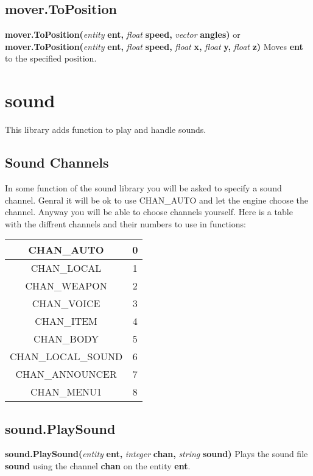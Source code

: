 \documentclass{scrreprt}
\begin{document}
\subsection{mover.ToPosition}
\label{mver-toposition}
\textbf{mover.ToPosition(}\textit{entity}\textbf{ ent, }\textit{float}\textbf{ speed, }\textit{vector}\textbf{ angles)} or
\newline
\textbf{mover.ToPosition(}\textit{entity}\textbf{ ent, }\textit{float}\textbf{ speed, }\textit{float}\textbf{ x, }\textit{float}\textbf{ y, }\textit{float}\textbf{ z)}
\newline
Moves \textbf{ent} to the specified position.
\newpage
\section{sound}
\label{sound}
This library adds function to play and handle sounds.
\subsection{Sound Channels}
\label{sound-chan}
In some function of the sound library you will be asked to specify a sound channel. Genral it will be ok to use CHAN\_AUTO and let the engine choose the channel. Anyway you will be able to choose channels yourself.
\newline
Here is a table with the diffrent channels and their numbers to use in functions:
\newline
\begin{center}
\begin{tabular}[c]{| c | c |}
\hline
CHAN\_AUTO & 0 \\
\hline
CHAN\_LOCAL & 1 \\
\hline
CHAN\_WEAPON & 2 \\
\hline
CHAN\_VOICE & 3 \\
\hline
CHAN\_ITEM & 4 \\
\hline
CHAN\_BODY & 5 \\
\hline
CHAN\_LOCAL\_SOUND & 6 \\
\hline
CHAN\_ANNOUNCER & 7 \\
\hline
CHAN\_MENU1 & 8 \\
\hline
\end{tabular}
\end{center}
\subsection{sound.PlaySound}
\label{snd-playsnd}
\textbf{sound.PlaySound(}\textit{entity}\textbf{ ent, }\textit{integer}\textbf{ chan, }\textit{string}\textbf{ sound)}
\newline
Plays the sound file \textbf{sound} using the channel \textbf{chan} on the entity \textbf{ent}.
\newpage
\end{document}
